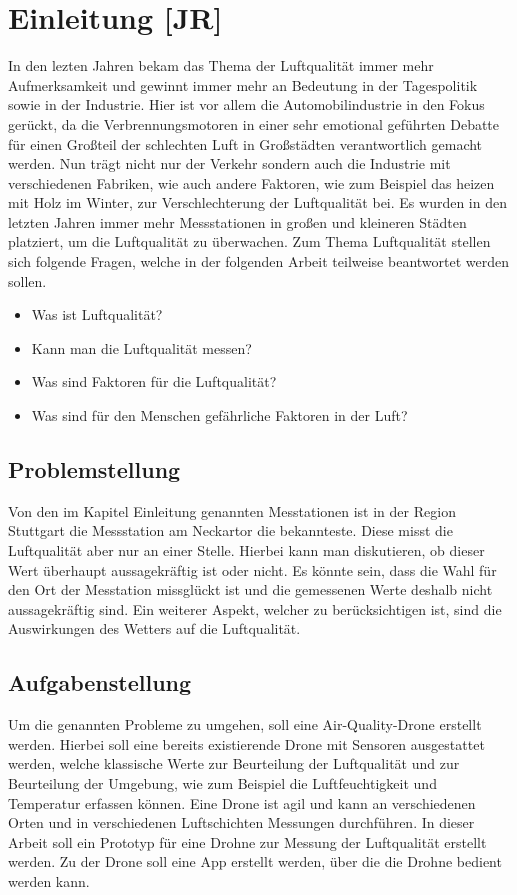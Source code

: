 
\chapter{Einleitung [JR]}\label{cha:Einleitung}
In den lezten Jahren bekam das Thema der Luftqualität immer mehr Aufmerksamkeit und gewinnt immer mehr an Bedeutung in der Tagespolitik sowie in der Industrie. Hier ist vor allem die Automobilindustrie in den Fokus gerückt, da die Verbrennungsmotoren in einer sehr emotional geführten Debatte für einen Großteil der schlechten Luft in Großstädten verantwortlich gemacht werden. Nun trägt nicht nur der Verkehr sondern auch die Industrie mit verschiedenen Fabriken, wie auch andere Faktoren, wie zum Beispiel das heizen mit Holz im Winter, zur Verschlechterung der Luftqualität bei. Es wurden in den letzten Jahren immer mehr Messstationen in großen und kleineren Städten platziert, um die Luftqualität zu überwachen.   
\newline
Zum Thema Luftqualität stellen sich folgende Fragen, welche in der folgenden Arbeit teilweise beantwortet werden sollen.
\begin{itemize}
	\item Was ist Luftqualität?
	\item Kann man die Luftqualität messen?
	\item Was sind Faktoren für die Luftqualität?
	\item Was sind für den Menschen gefährliche Faktoren in der Luft?
\end{itemize}	
 
\section{Problemstellung}\label{sec:Problemstellung}
Von den im Kapitel Einleitung genannten Messtationen ist in der Region Stuttgart die Messstation am Neckartor die bekannteste. Diese misst die Luftqualität aber nur an einer Stelle. Hierbei kann man diskutieren, ob dieser Wert überhaupt aussagekräftig ist oder nicht. Es könnte sein, dass die Wahl für den Ort der Messtation missglückt ist und die gemessenen Werte deshalb nicht aussagekräftig sind. 
\newline
Ein weiterer Aspekt, welcher zu berücksichtigen ist, sind die Auswirkungen des Wetters auf die Luftqualität. 

\section{Aufgabenstellung}\label{sec:Aufgabenstellung}
Um die genannten Probleme zu umgehen, soll eine Air-Quality-Drone erstellt werden. Hierbei soll eine bereits existierende Drone mit Sensoren ausgestattet werden, welche klassische Werte zur Beurteilung der Luftqualität und zur Beurteilung der Umgebung, wie zum Beispiel die Luftfeuchtigkeit und Temperatur erfassen können. Eine Drone ist agil und kann an verschiedenen Orten und in verschiedenen Luftschichten Messungen durchführen. 
\newline
In dieser Arbeit soll ein Prototyp für eine Drohne zur Messung der Luftqualität erstellt werden. Zu der Drone soll eine App erstellt werden, über die die Drohne bedient werden kann. 